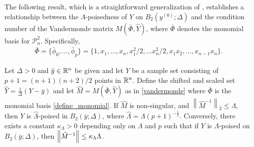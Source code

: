 \documentclass{article}
\begin{document}







The following result, which is a straightforward generalization of  \cite[Theorem 3.14]{introduction_book},  establishes a relationship between the $\Lambda$-poisedness of $Y$ on $B_2(y^{(0)};\Delta)$ and the condition number of the Vandermonde matrix $M(\bar{\Phi},\hat{Y})$, where $\bar{\Phi}$ denotes the monomial basis for $\mathcal{P}^2_n$.  Specifically,
\begin{align}
\label{define_monomial}
\bar{\Phi} = \{ \bar{\phi}_0, \ldots, \bar{\phi}_p\} =\{1, x_1, \ldots, x_n, x_1^2/2, \ldots x_n^2/2,x_1 x_2, \ldots, x_{n-1}x_{n}\}.
\end{align}




\begin{theorem} \label{scale_the_radius}
\label{Lambda_poised_error_bounds_delta}
Let $\Delta >0$ and $\bar{y} \in \mathbb R^n$ be given and  let $Y$ be a sample set consisting of $p+1=(n+1)(n+2)/2$ points in  $\mathbb R^n$.
Define the shifted and scaled set $\hat{Y} = \frac{1}{\Delta} \left(Y-\bar{y}\right)$ and let $\hat{M}=M(\bar{\Phi},\hat{Y})$ as in \cref{vandermonde} where $\bar{\Phi}$ is the monomial basis \cref{define_monomial}.
If $\hat{M}$ is non-singular, and $\left\|{\hat{M}^{-1}}\right\|_2 \le \Lambda$, then $Y$ is $\hat{\Lambda}$-poised in $B_2(\bar{y};\Delta)$,
where $\hat{\Lambda} = \Lambda \left(p+1\right)^{-\frac 1 2}$.
Conversely,  there exists a constant $\kappa_\Lambda > 0$ depending only on $\Lambda$ and $p$ such that if $Y$ is $\Lambda$-poised on $B_2(\bar{y};\Delta)$, then ${\left\|\hat{M}^{-1}\right\|} \le \kappa_{\Lambda} \Lambda$.
\end{theorem}
\end{document}
